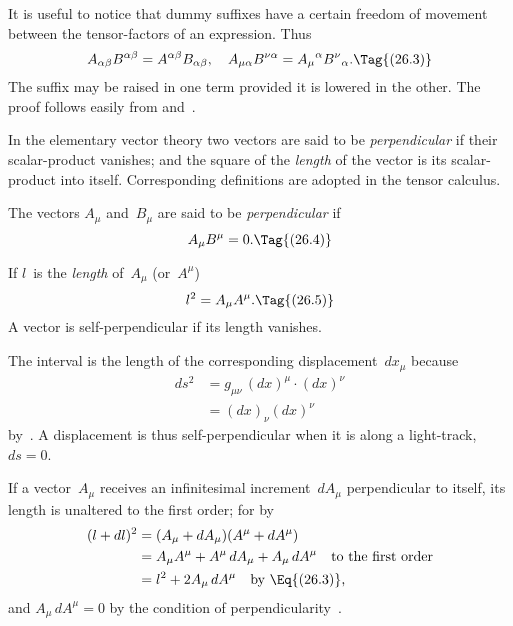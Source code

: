 \documentclass[12pt]{book}
\begin{document}
It is useful to notice that dummy suffixes have a certain freedom of movement
between the tensor-factors of an expression. Thus
\[
A_{\alpha\beta} B^{\alpha\beta} = A^{\alpha\beta} B_{\alpha\beta},\quad
A_{\mu\alpha} B^{\nu\alpha} = {A_{\mu}}^{\alpha} {B^{\nu}}_{\alpha}.
\Tag{(26.3)}
\]
The suffix may be raised in one term provided it is lowered in the other.
The proof follows easily from  and~.

In the elementary vector theory two vectors are said to be \emph{perpendicular}
%
%
%
if their scalar-product vanishes; and the square of the \emph{length} of the vector is
its scalar-product into itself. Corresponding definitions are adopted in the
tensor calculus.

The vectors $A_{\mu}$ and~$B_{\mu}$ are said to be \emph{perpendicular} if
\[
A_{\mu} B^{\mu} = 0.
\Tag{(26.4)}
\]

If $l$~is the \emph{length} of~$A_{\mu}$ (or~$A^{\mu}$)
\[
l^{2} = A_{\mu} A^{\mu}.
\Tag{(26.5)}
\]
A vector is self-perpendicular if its length vanishes.

The interval is the length of the corresponding displacement~$dx_{\mu}$ because
\begin{align*}
  ds^{2} &= g_{\mu\nu}\, (dx)^{\mu} \cdot (dx)^{\nu} \\
  &= (dx)_{\nu} (dx)^{\nu}
\end{align*}
by~. A displacement is thus self-perpendicular when it is along a
light-track, $ds = 0$.

If a vector~$A_{\mu}$ receives an infinitesimal increment~$dA_{\mu}$ perpendicular to
itself, its length is unaltered to the first order; for by~
\begin{align*}
  (l + dl)^{2}
  &= (A_{\mu} + dA_{\mu}) (A^{\mu} + dA^{\mu}) \\
  &= A_{\mu} A^{\mu} + A^{\mu}\, dA_{\mu} + A_{\mu}\, dA^{\mu}\quad\text{to the first order} \\
  &= l^{2} + 2A_{\mu}\, dA^{\mu} \quad\text{by~\Eq{(26.3)},}
\end{align*}
and $A_{\mu}\, dA^{\mu} = 0$ by the condition of perpendicularity~.
\end{document}
